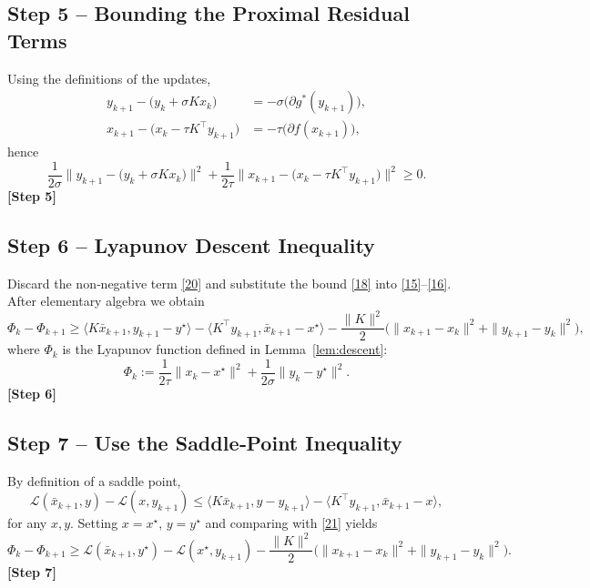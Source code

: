 \documentclass[11pt]{article}
\begin{document}
\subsection*{Step 5 – Bounding the Proximal Residual Terms}
Using the definitions of the updates,
\[
\begin{aligned}
y_{k+1}-\bigl(y_{k}+\sigma Kx_{k}\bigr)&= -\sigma\bigl(\partial g^{*}(y_{k+1})\bigr),\\
x_{k+1}-\bigl(x_{k}-\tau K^{\top}y_{k+1}\bigr)&= -\tau\bigl(\partial f(x_{k+1})\bigr),
\end{aligned}
\tag{19}
\]
hence
\[
\frac{1}{2\sigma}\|y_{k+1}-\bigl(y_{k}+\sigma Kx_{k}\bigr)\|^{2}
+\frac{1}{2\tau}\|x_{k+1}-\bigl(x_{k}-\tau K^{\top}y_{k+1}\bigr)\|^{2}
\ge 0.
\tag{20}
\]
\textbf{[Step 5]}

\subsection*{Step 6 – Lyapunov Descent Inequality}
Discard the non‑negative term \eqref{20} and substitute the bound \eqref{18} into \eqref{15}–\eqref{16}. After elementary algebra we obtain
\[
\Phi_{k}-\Phi_{k+1}
\ge \langle K\bar{x}_{k+1},y_{k+1}-y^{\star}\rangle
   -\langle K^{\top}y_{k+1},\bar{x}_{k+1}-x^{\star}\rangle
   -\frac{\|K\|^{2}}{2}\bigl(\|x_{k+1}-x_{k}\|^{2}+\|y_{k+1}-y_{k}\|^{2}\bigr),
\tag{21}
\]
where $\Phi_{k}$ is the Lyapunov function defined in Lemma~\ref{lem:descent}:
\[
\Phi_{k}:=\frac{1}{2\tau}\|x_{k}-x^{\star}\|^{2}
          +\frac{1}{2\sigma}\|y_{k}-y^{\star}\|^{2}.
\tag{22}
\]
\textbf{[Step 6]}

\subsection*{Step 7 – Use the Saddle‑Point Inequality}
By definition of a saddle point,
\[
\mathcal{L}(\bar{x}_{k+1},y)-\mathcal{L}(x,y_{k+1})\le
\langle K\bar{x}_{k+1},y-y_{k+1}\rangle
-\langle K^{\top}y_{k+1},\bar{x}_{k+1}-x\rangle,
\tag{23}
\]
for any $x,y$. Setting $x=x^{\star}$, $y=y^{\star}$ and comparing with \eqref{21} yields
\[
\Phi_{k}-\Phi_{k+1}\ge \mathcal{L}(\bar{x}_{k+1},y^{\star})
                     -\mathcal{L}(x^{\star},y_{k+1})
                     -\frac{\|K\|^{2}}{2}\bigl(\|x_{k+1}-x_{k}\|^{2}
                                            +\|y_{k+1}-y_{k}\|^{2}\bigr).
\tag{24}
\]
\textbf{[Step 7]}
\end{document}
